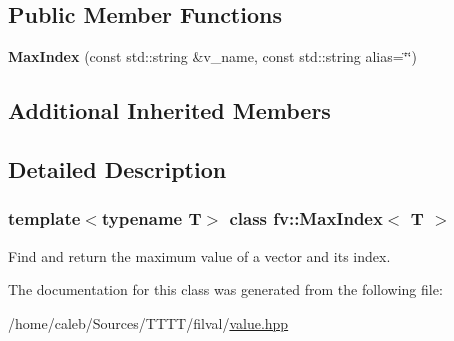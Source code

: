 \subsection*{Public Member Functions}
\begin{DoxyCompactItemize}
\item 
\hypertarget{classfv_1_1MaxIndex_a3c57ca62c2924bb21a17518bb245e8b8}{}\label{classfv_1_1MaxIndex_a3c57ca62c2924bb21a17518bb245e8b8} 
{\bfseries Max\+Index} (const std\+::string \&v\+\_\+name, const std\+::string alias=\char`\"{}\char`\"{})
\end{DoxyCompactItemize}
\subsection*{Additional Inherited Members}


\subsection{Detailed Description}
\subsubsection*{template$<$typename T$>$\newline
class fv\+::\+Max\+Index$<$ T $>$}

Find and return the maximum value of a vector and its index. 

The documentation for this class was generated from the following file\+:\begin{DoxyCompactItemize}
\item 
/home/caleb/\+Sources/\+T\+T\+T\+T/filval/\hyperlink{value_8hpp}{value.\+hpp}\end{DoxyCompactItemize}
